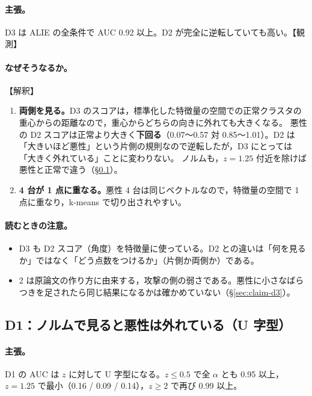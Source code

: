 \documentclass[a4j, dvipdfmx]{jsarticle}  %
\begin{document}
\paragraph{主張。}
D3 は ALIE の全条件で AUC 0.92 以上。D2 が完全に逆転していても高い。【観測】

\paragraph{なぜそうなるか。}【解釈】
\begin{enumerate}
  \item \textbf{両側を見る。}D3 のスコアは，標準化した特徴量の空間での正常クラスタの重心からの距離なので，重心からどちらの向きに外れても大きくなる。
        悪性の D2 スコアは正常より大きく\textbf{下回る}（0.07〜0.57 対 0.85〜1.01）。D2 は「大きいほど悪性」という片側の規則なので逆転したが，D3 にとっては「大きく外れている」ことに変わりない。
        ノルムも，$z = 1.25$ 付近を除けば悪性と正常で違う（\S\ref{sec:claim-alie-d1}）。
  \item \textbf{4 台が 1 点に重なる。}悪性 4 台は同じベクトルなので，特徴量の空間で 1 点に重なり，k-means で切り出されやすい。
\end{enumerate}

\paragraph{読むときの注意。}
\begin{itemize}
  \item D3 も D2 スコア（角度）を特徴量に使っている。D2 との違いは「何を見るか」ではなく「どう点数をつけるか」（片側か両側か）である。
  \item 2 は原論文の作り方に由来する，攻撃の側の弱さである。悪性に小さなばらつきを足されたら同じ結果になるかは確かめていない（\S\ref{sec:claim-d3}）。
\end{itemize}

\subsection{D1：ノルムで見ると悪性は外れている（U 字型）}
\label{sec:claim-alie-d1}

\paragraph{主張。}
D1 の AUC は $z$ に対して U 字型になる。$z \le 0.5$ で全 $\alpha$ とも 0.95 以上，$z = 1.25$ で最小（0.16 / 0.09 / 0.14），$z \ge 2$ で再び 0.99 以上。
\end{document}
